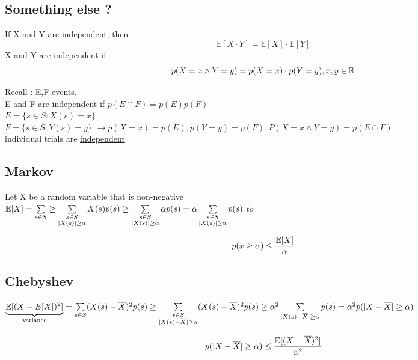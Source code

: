 \documentclass[12pt,a4paper]{article}
\begin{document}
\subsection{Something else ?}
\begin{boite}
	 If X and Y are independent, then 
	\begin{equation}
		\mathbb{E}[X\cdot Y] = \mathbb{E}[X]\cdot \mathbb{E}[Y]
	\end{equation}
	X and Y are independent if
	\begin{equation}
		p(X=x \wedge Y=y) = p(X=x) \cdot p(Y=y), x,y \in \mathbb{R}
	\end{equation}
\end{boite}
Recall : E,F events.\\
E and F are independent if $p(E\cap F) = p(E)p(F)$\\
$E= \{s\in S : X(s) = x\}$\\
$F= \{s\in S : Y(s) = y\}$
$\to p(X=x) = p(E), p(Y=y) = p(F), P(X=x \wedge Y=y) = p(E\cap F)$\\
 individual trials are \underline{independent}\\

\subsection{Markov}
Let X be a random variable that is non-negative\\
$\mathbb{E}[X] = \sum\limits_{s\in S} \geq \sum\limits_{\substack{s\in S \\ |X(s)| \geq \alpha}} X(s) p(s) \geq \sum\limits_{\substack{s\in S \\ |X(s)| \geq \alpha}} \alpha p(s) = \alpha \sum\limits_{\substack{s\in S \\ |X(s)| \geq \alpha}}p(s)$
$to$
\begin{boite}
	\begin{equation}
		p(x\geq \alpha) \leq \frac{\mathbb{E}[X]}{\alpha}
	\end{equation}
\end{boite}

\subsection{Chebyshev}
$\underbrace{\mathbb{E}[(X-E[X])^2]}_{\text{variance}} = \sum\limits_{s\in S}(X(s) - \overline{X})^2 p(s)  \geq \sum\limits_{\substack{s\in S \\ |X(s) - \overline{X}| \geq \alpha}} (X(s) - \overline{X})^2 p(s) \geq \alpha^2\sum\limits_{|X(s)-\overline{X}| \geq \alpha} p(s) = \alpha^2 p(|X-\overline{X}| \geq \alpha)$  
\begin{boite}
	\begin{equation}
	p(|X-\overline{X}| \geq \alpha) \leq \frac{\mathbb{E}[(X-\overline{X})^2]}{\alpha^2}
	\end{equation}
\end{boite}
\end{document}
